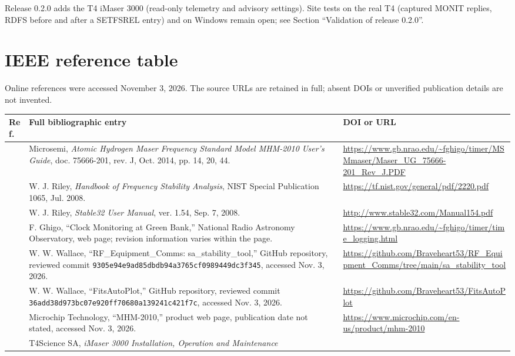 \documentclass[11pt,a4paper]{article}
\begin{document}
Release 0.2.0 adds the T4 iMaser 3000 (read-only telemetry and advisory
settings). Site tests on the real T4 (captured MONIT replies, RDFS before and
after a SETFSREL entry) and on Windows remain open; see Section ``Validation of
release 0.2.0''.

\section{IEEE reference table}
Online references were accessed November 3, 2026. The source URLs are retained
in full; absent DOIs or unverified publication details are not invented.

\small
\begin{longtable}{@{}p{.05\linewidth}p{.53\linewidth}p{.34\linewidth}@{}}
\toprule
Ref. & Full bibliographic entry & DOI or URL\\
\midrule
\endhead
[1] & Microsemi, \textit{Atomic Hydrogen Maser Frequency Standard Model
MHM-2010 User's Guide}, doc. 75666-201, rev. J, Oct. 2014, pp. 14, 20, 44.
& \url{https://www.gb.nrao.edu/~fghigo/timer/MSMmaser/Maser_UG_75666-201_Rev_J.PDF}\\[5pt]
[2] & W. J. Riley, \textit{Handbook of Frequency Stability Analysis},
NIST Special Publication 1065, Jul. 2008.
& \url{https://tf.nist.gov/general/pdf/2220.pdf}\\[5pt]
[3] & W. J. Riley, \textit{Stable32 User Manual}, ver. 1.54,
Sep. 7, 2008.
& \url{http://www.stable32.com/Manual154.pdf}\\[5pt]
[4] & F. Ghigo, ``Clock Monitoring at Green Bank,'' National Radio Astronomy
Observatory, web page; revision information varies within the page.
& \url{https://www.gb.nrao.edu/~fghigo/timer/time_logging.html}\\[5pt]
[5] & W. W. Wallace, ``RF\_Equipment\_Comms: sa\_stability\_tool,''
GitHub repository, reviewed commit
\texttt{9305e94e9ad85dbdb94a3765cf0989449dc3f345}, accessed Nov. 3, 2026.
& \url{https://github.com/Braveheart53/RF_Equipment_Comms/tree/main/sa_stability_tool}\\[5pt]
[6] & W. W. Wallace, ``FitsAutoPlot,'' GitHub repository, reviewed commit
\texttt{36add38d973bc07e920ff70680a139241c421f7c}, accessed Nov. 3, 2026.
& \url{https://github.com/Braveheart53/FitsAutoPlot}\\[5pt]
[7] & Microchip Technology, ``MHM-2010,'' product web page, publication date
not stated, accessed Nov. 3, 2026.
& \url{https://www.microchip.com/en-us/product/mhm-2010}\\[5pt]
[8] & T4Science SA, \textit{iMaser 3000 Installation, Operation and Maintenance
}
\end{longtable}
\end{document}
